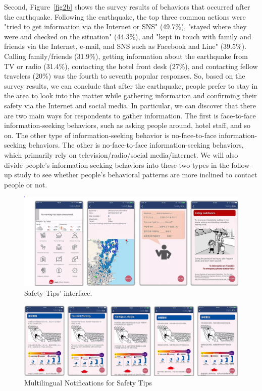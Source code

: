 Second, Figure~\ref{fig2b} shows the survey results of behaviors that occurred after the earthquake. Following the earthquake, the top three common actions were "tried to get information via the Internet or SNS" (49.7\%), "stayed where they were and checked on the situation" (44.3\%), and "kept in touch with family and friends via the Internet, e-mail, and SNS such as Facebook and Line" (39.5\%). Calling family/friends (31.9\%), getting information about the earthquake from TV or radio (31.4\%), contacting the hotel front desk (27\%), and contacting fellow travelers (20\%) was the fourth to seventh popular responses. So, based on the survey results, we can conclude that after the earthquake, people prefer to stay in the area to look into the matter while gathering information and confirming their safety via the Internet and social media. In particular, we can discover that there are two main ways for respondents to gather information. The first is face-to-face information-seeking behaviors, such as asking people around, hotel staff, and so on. The other type of information-seeking behavior is no-face-to-face information-seeking behaviors. The other is no-face-to-face information-seeking behaviors, which primarily rely on television/radio/social media/internet. We will also divide people's information-seeking behaviors into these two types in the follow-up study to see whether people's behavioral patterns are more inclined to contact people or not.

\begin{figure}[h]
  \includegraphics[width=\linewidth]{Figure/Figure3.png}
  \centering
  \caption[Safety Tips' interface]{Safety Tips' interface.\protect\footnotemark }
  \label{fig3}
\end{figure}

\begin{figure}[h]
  \includegraphics[width=\linewidth]{Figure/Figure4.png}
  \centering
  \caption[Multilingual Notifications for Safety Tips]{Multilingual Notifications for Safety Tips\protect\footnotemark }
  \label{fig4}
\end{figure}


